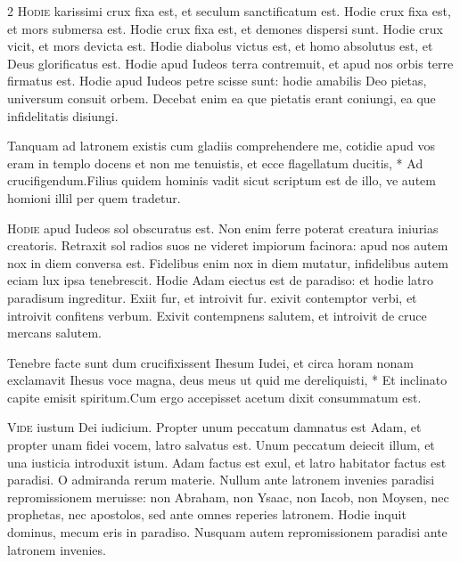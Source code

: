 \begin{multicols*}{2}
\lettrine[lines=2]{\zallmancaps \color{Red} H}{odie} karissimi crux fixa est, et seculum sanctificatum est. Hodie crux fixa est, et mors submersa est. Hodie crux fixa est, et demones dispersi sunt. Hodie crux vicit, et mors devicta est. Hodie diabolus victus est, et homo absolutus est, et Deus glorificatus est. Hodie apud Iudeos terra contremuit, et apud nos orbis terre firmatus est. Hodie apud Iudeos petre scisse sunt: hodie amabilis Deo pietas, universum consuit orbem. Decebat enim ea que pietatis erant coniungi, ea que infidelitatis disiungi.
\begin{responsory}
{Tanquam ad latronem existis cum gladiis comprehendere me, cotidie apud vos eram in templo docens et non me tenuistis, et ecce flagellatum ducitis, * Ad crucifigendum.}{Filius quidem hominis vadit sicut scriptum est de illo, ve autem homioni illil per quem tradetur.}
\end{responsory}%
\lettrine[lines=2]{\zallmancaps \color{Blue} H}{odie} apud Iudeos sol obscuratus est. Non enim ferre poterat creatura iniurias creatoris. Retraxit sol radios suos ne videret impiorum facinora: apud nos autem nox in diem conversa est. Fidelibus enim nox in diem mutatur, infidelibus autem eciam lux ipsa tenebrescit. Hodie Adam eiectus est de paradiso: et hodie latro paradisum ingreditur. Exiit fur, et introivit fur. exivit contemptor verbi, et introivit confitens verbum. Exivit contempnens salutem, et introivit de cruce mercans salutem.
\begin{responsory}
{Tenebre facte sunt dum crucifixissent Ihesum Iudei, et circa horam nonam exclamavit Ihesus voce magna, deus meus ut quid me dereliquisti, * Et inclinato capite emisit spiritum.}{Cum ergo accepisset acetum dixit consummatum est.}
\end{responsory}%
\lettrine[lines=2]{\zallmancaps \color{Red} V}{ide} iustum Dei iudicium. Propter unum peccatum damnatus est Adam, et propter unam fidei vocem, latro salvatus est. Unum peccatum deiecit illum, et una iusticia introduxit istum. Adam factus est exul, et latro habitator factus est paradisi. O admiranda rerum materie. Nullum ante latronem invenies paradisi repromissionem meruisse: non Abraham, non Ysaac, non Iacob, non Moysen, nec prophetas, nec apostolos, sed ante omnes reperies latronem. Hodie inquit dominus, mecum eris in paradiso. Nusquam autem repromissionem paradisi ante latronem invenies.

\end{multicols*}
